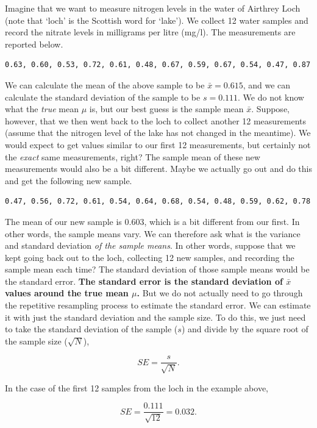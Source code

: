 \documentclass[
  openany]{krantz}
\begin{document}
Imagine that we want to measure nitrogen levels in the water of Airthrey Loch (note that `loch' is the Scottish word for `lake').
We collect 12 water samples and record the nitrate levels in milligrams per litre (mg/l).
The measurements are reported below.

\begin{verbatim}
0.63, 0.60, 0.53, 0.72, 0.61, 0.48, 0.67, 0.59, 0.67, 0.54, 0.47, 0.87
\end{verbatim}

We can calculate the mean of the above sample to be \(\bar{x} = 0.615\), and we can calculate the standard deviation of the sample to be \(s = 0.111\).
We do not know what the \emph{true} mean \(\mu\) is, but our best guess is the sample mean \(\bar{x}\).
Suppose, however, that we then went back to the loch to collect another 12 measurements (assume that the nitrogen level of the lake has not changed in the meantime).
We would expect to get values similar to our first 12 measurements, but certainly not the \emph{exact} same measurements, right?
The sample mean of these new measurements would also be a bit different.
Maybe we actually go out and do this and get the following new sample.

\begin{verbatim}
0.47, 0.56, 0.72, 0.61, 0.54, 0.64, 0.68, 0.54, 0.48, 0.59, 0.62, 0.78
\end{verbatim}

The mean of our new sample is 0.603, which is a bit different from our first.
In other words, the sample means vary.
We can therefore ask what is the variance and standard deviation \emph{of the sample means}.
In other words, suppose that we kept going back out to the loch, collecting 12 new samples, and recording the sample mean each time?
The standard deviation of those sample means would be the standard error.
\textbf{The standard error is the standard deviation of \(\bar{x}\) values around the true mean \(\mu\).}
But we do not actually need to go through the repetitive resampling process to estimate the standard error.
We can estimate it with just the standard deviation and the sample size.
To do this, we just need to take the standard deviation of the sample (\(s\)) and divide by the square root of the sample size (\(\sqrt{N}\)),

\[SE = \frac{s}{\sqrt{N}}.\]

In the case of the first 12 samples from the loch in the example above,

\[SE = \frac{0.111}{\sqrt{12}} = 0.032.\]
\end{document}
